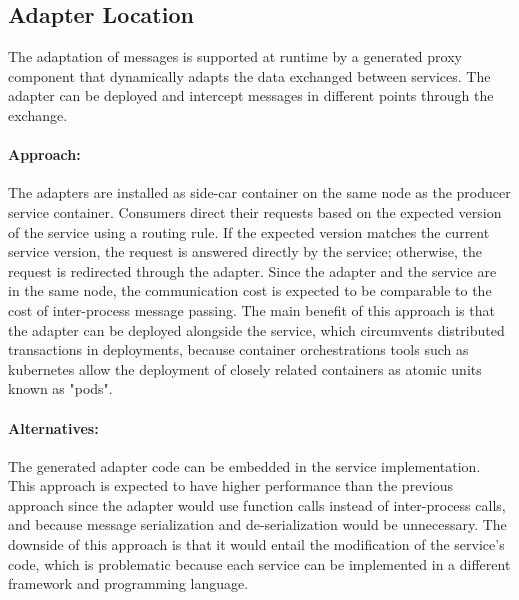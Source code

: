 \subsection{Adapter Location} %
\label{sec:adapter_location}

The adaptation of messages is supported at runtime by a generated proxy component
that dynamically adapts the data exchanged between services.
The adapter can be deployed and intercept messages in different points through the exchange.

\paragraph{Approach:}
The adapters are installed as side-car container on the same node as the producer service container.
Consumers direct their requests based on the expected version of the service using a routing rule.
If the expected version matches the current service version, the request is answered directly by the service;
otherwise, the request is redirected through the adapter.
Since the adapter and the service are in the same node, the communication cost is expected to be comparable to the cost of inter-process message passing.
The main benefit of this approach is that the adapter can be deployed alongside the service,
which circumvents distributed transactions in deployments,
because container orchestrations tools such as kubernetes allow the deployment of closely related containers as atomic units known as "pods".

\paragraph{Alternatives:}
The generated adapter code can be embedded in the service implementation.
This approach is expected to have higher performance than the previous approach since
the adapter would use function calls instead of inter-process calls, and because message serialization and de-serialization would be unnecessary.
The downside of this approach is that it would entail the modification of the service's code, which is problematic because each service can be implemented in a different framework and programming language.

\paragraph{}


